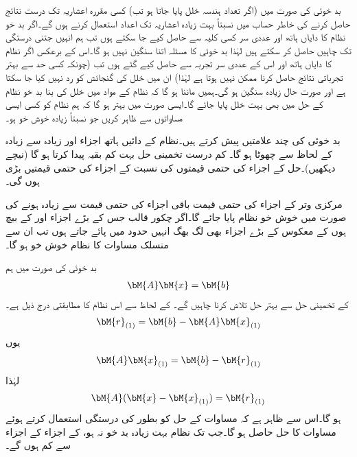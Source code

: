 بد خوئی کی صورت میں (اگر تعداد ہندسہ خلل پایا جاتا ہو تب) کسی مقررہ اعشاریہ تک درست نتائج حاصل کرنے کی خاطر حساب میں نسبتاً بہت زیادہ اعشاریہ تک اعداد استعمال کرنے ہوں گے۔اگر بد خو نظام کا دایاں ہاتھ اور  عددی سر کسی کلیہ سے حاصل کیے جا سکتے ہوں تب ہم انہیں جتنی درستگی تک  چاہیں حاصل کر سکتے ہیں لہٰذا بد خوئی کا مسئلہ اتنا سنگین نہیں ہو گا۔اس کے برعکس اگر نظام کا دایاں ہاتھ اور اس کے عددی سر تجربہ سے حاصل کیے گئے ہوں تب (چونکہ کسی حد سے بہتر تجرباتی نتائج حاصل کرنا ممکن نہیں ہوتا ہے لہٰذا)   ان میں خلل کی گنجائش کو رد نہیں کیا جا سکتا ہے  اور صورت حال زیادہ سنگین ہو گی۔ہمیں ماننا  ہو گا کہ نظام کے مواد میں خلل کی بنا بد خو نظام کے حل میں بھی بہت خلل پایا جائے گا۔ایسی صورت میں بہتر ہو گا کہ ہم نظام کو کسی ایسی مساواتوں سے ظاہر کریں جو نسبتاً زیادہ خوش خو ہو۔

بد خوئی کی چند علامتیں پیش کرتے ہیں۔نظام کے دائیں ہاتھ اجزاء اور زیادہ سے زیادہ  کے لحاظ سے  چھوٹا ہو گا۔ کم درست تخمینی حل بہت کم  بقیہ پیدا کرتا ہو گا (نیچے دیکھیں)۔حل کے اجزاء کی حتمی قیمتوں کی نسبت  کے اجزاء کی حتمی قیمتیں بڑی ہوں گی۔ 

مرکزی وتر کے اجزاء کی حتمی قیمت باقی اجزاء کی حتمی قیمت سے زیادہ ہونے کی صورت میں خوش خو نظام پایا جائے گا۔اگر چکور قالب جس کے بڑے اجزاء  اور  کے بیچ ہوں کے معکوس کے بڑے اجزاء بھی لگ بھگ انہیں حدود میں پائے جاتے ہوں تب ان سے منسلک مساوات کا نظام خوش خو ہو گا۔ 

بد خوئی کی صورت میں ہم
\begin{align}\label{مساوات_خطی_اعدادی_نظام_بقیہ_الف}
\bM{A}\bM{x}=\bM{b}
\end{align}
کے تخمینی حل  سے  بہتر حل تلاش کرنا چاہیں گے۔  کے لحاظ سے اس نظام کا مطابقتی  درج ذیل ہے۔ 
\begin{align*}
\bM{r}_{(1)}=\bM{b}-\bM{A}\bM{x}_{(1)}
\end{align*}
یوں 
\begin{align*}
\bM{A}\bM{x}_{(1)}=\bM{b}-\bM{r}_{(1)}
\end{align*}
لہٰذا
\begin{align}\label{مساوات_خطی_اعدادی_نظام_بقیہ_ب}
\bM{A}(\bM{x}-\bM{x}_{(1)})=\bM{r}_{(1)}
\end{align}
ہو گا۔اس سے ظاہر ہے کہ مساوات  کے حل کو بطور   کی درستگی استعمال کرتے ہوئے مساوات  کا حل حاصل ہو گا۔جب تک نظام بہت زیادہ بد خو نہ ہو،  کے اجزاء  کے اجزاء سے کم ہوں گے۔

